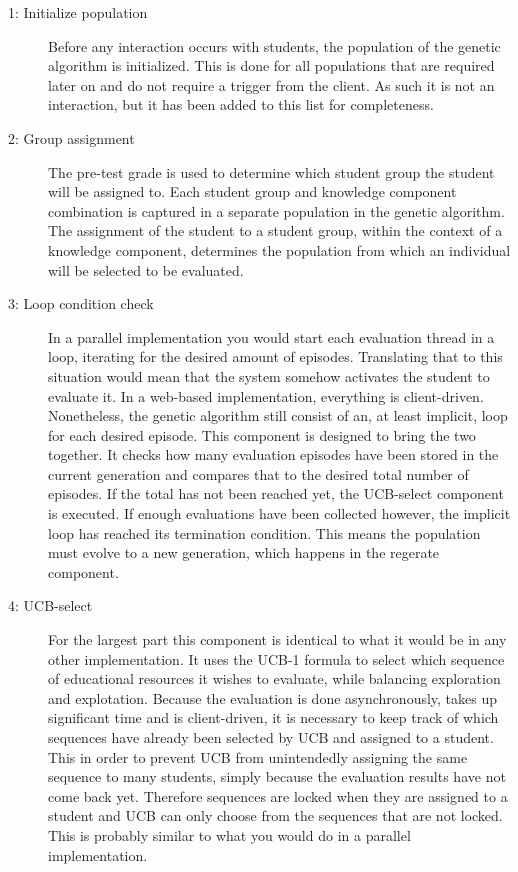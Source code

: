 \begin{description}
	\item[1: Initialize population] Before any interaction occurs with students,
		the population of the genetic algorithm is initialized. This is done for
		all populations that are required later on and do not require a
		trigger from the client. As such it is not an interaction, but it has
		been added to this list for completeness.
	\item[2: Group assignment] The pre-test grade is used to determine
		which student group the student will be assigned to. Each student
		group and knowledge component combination is captured in a separate
		population in the genetic algorithm. The assignment of the student to a
		student group, within the context of a knowledge component, determines
		the population from which an individual will be selected to be
		evaluated.
	\item[3: Loop condition check] In a parallel implementation you would start
		each evaluation thread in a loop, iterating for the desired amount of
		episodes. Translating that to this situation would mean that the system
		somehow activates the student to evaluate it. In a web-based
		implementation, everything is client-driven. Nonetheless, the genetic
		algorithm still consist of an, at least implicit, loop for each desired
		episode. This component is designed to bring the two together. It
		checks how many evaluation episodes have been stored in the current
		generation and compares that to the desired total number of episodes.
		If the total has not been reached yet, the UCB-select component is
		executed. If enough evaluations have been collected however, the
		implicit loop has reached its termination condition. This means the
		population must evolve to a new generation, which happens in the
		regerate component.
	\item[4: UCB-select] For the largest part this component is identical to
		what it would be in any other implementation. It uses the UCB-1 formula
		to select which sequence of educational resources it wishes to evaluate,
		while balancing exploration and explotation. Because the evaluation is done
		asynchronously, takes up significant time and is client-driven,
		it is necessary to keep track of which sequences have already been
		selected by UCB and assigned to a student. This in order to prevent
		UCB from unintendedly assigning the same sequence to many students,
		simply because the evaluation results have not come back yet. Therefore
		sequences are locked when they are assigned to a student and UCB can
		only choose from the sequences that are not locked. This is probably
		similar to what you would do in a parallel implementation.


\end{description}
